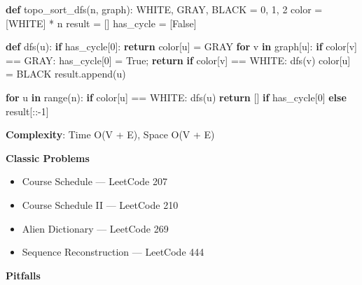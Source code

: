 \documentclass[11pt]{article}
\providecommand{\tightlist}{\setlength{\itemsep}{1pt}\setlength{\parskip}{0pt}}
\newenvironment{Shaded}{\begin{snugshade}}{\end{snugshade}}
\newcommand{\BuiltInTok}[1]{\textcolor[rgb]{0.50,0.55,0.55}{#1}}
\newcommand{\ControlFlowTok}[1]{\textcolor[rgb]{0.99,0.74,0.29}{\textbf{#1}}}
\newcommand{\DecValTok}[1]{\textcolor[rgb]{0.96,0.45,0.00}{#1}}
\newcommand{\KeywordTok}[1]{\textcolor[rgb]{0.81,0.81,0.76}{\textbf{#1}}}
\newcommand{\NormalTok}[1]{\textcolor[rgb]{0.81,0.81,0.76}{#1}}
\newcommand{\OperatorTok}[1]{\textcolor[rgb]{0.81,0.81,0.76}{#1}}
\newcommand{\VariableTok}[1]{\textcolor[rgb]{0.15,0.68,0.68}{#1}}
\begin{document}
\begin{Shaded}
\begin{Highlighting}[]
\KeywordTok{def}\NormalTok{ topo\_sort\_dfs(n, graph):}
\NormalTok{    WHITE, GRAY, BLACK }\OperatorTok{=} \DecValTok{0}\NormalTok{, }\DecValTok{1}\NormalTok{, }\DecValTok{2}
\NormalTok{    color }\OperatorTok{=}\NormalTok{ [WHITE] }\OperatorTok{*}\NormalTok{ n}
\NormalTok{    result }\OperatorTok{=}\NormalTok{ []}
\NormalTok{    has\_cycle }\OperatorTok{=}\NormalTok{ [}\VariableTok{False}\NormalTok{]}

    \KeywordTok{def}\NormalTok{ dfs(u):}
        \ControlFlowTok{if}\NormalTok{ has\_cycle[}\DecValTok{0}\NormalTok{]: }\ControlFlowTok{return}
\NormalTok{        color[u] }\OperatorTok{=}\NormalTok{ GRAY}
        \ControlFlowTok{for}\NormalTok{ v }\KeywordTok{in}\NormalTok{ graph[u]:}
            \ControlFlowTok{if}\NormalTok{ color[v] }\OperatorTok{==}\NormalTok{ GRAY:}
\NormalTok{                has\_cycle[}\DecValTok{0}\NormalTok{] }\OperatorTok{=} \VariableTok{True}\OperatorTok{;} \ControlFlowTok{return}
            \ControlFlowTok{if}\NormalTok{ color[v] }\OperatorTok{==}\NormalTok{ WHITE:}
\NormalTok{                dfs(v)}
\NormalTok{        color[u] }\OperatorTok{=}\NormalTok{ BLACK}
\NormalTok{        result.append(u)}

    \ControlFlowTok{for}\NormalTok{ u }\KeywordTok{in} \BuiltInTok{range}\NormalTok{(n):}
        \ControlFlowTok{if}\NormalTok{ color[u] }\OperatorTok{==}\NormalTok{ WHITE:}
\NormalTok{            dfs(u)}
    \ControlFlowTok{return}\NormalTok{ [] }\ControlFlowTok{if}\NormalTok{ has\_cycle[}\DecValTok{0}\NormalTok{] }\ControlFlowTok{else}\NormalTok{ result[::}\OperatorTok{{-}}\DecValTok{1}\NormalTok{]}
\end{Highlighting}
\end{Shaded}

\textbf{Complexity}: Time O(V + E), Space O(V + E)

\textbf{Classic Problems}

\begin{itemize}
\tightlist
\item
  Course Schedule --- LeetCode 207
\item
  Course Schedule II --- LeetCode 210
\item
  Alien Dictionary --- LeetCode 269
\item
  Sequence Reconstruction --- LeetCode 444
\end{itemize}

\textbf{Pitfalls}
\end{document}

